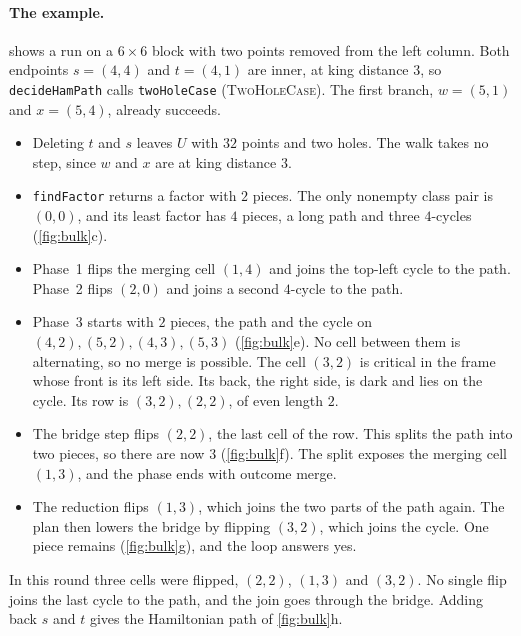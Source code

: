 \documentclass[11pt]{article}
\theoremstyle{plain}
\theoremstyle{definition}
\theoremstyle{remark}
\newcommand{\lean}[1]{\texttt{#1}}
\begin{document}
\paragraph{The example.}
 shows a run on a $6\times6$ block with two points removed from the left column.
Both endpoints $s=(4,4)$ and $t=(4,1)$ are inner, at king distance $3$, so \lean{decideHamPath} calls
\lean{twoHoleCase} (\textsc{TwoHoleCase}).
The first branch, $w=(5,1)$ and $x=(5,4)$, already succeeds.
\begin{itemize}
\item Deleting $t$ and $s$ leaves $U$ with $32$ points and two holes.
  The walk takes no step, since $w$ and $x$ are at king distance $3$.
\item \lean{findFactor} returns a factor with $2$ pieces.
  The only nonempty class pair is $(0,0)$, and its least factor has $4$ pieces, a long path and
  three $4$-cycles (\cref{fig:bulk}c).
\item Phase~1 flips the merging cell $(1,4)$ and joins the top-left cycle to the path.
  Phase~2 flips $(2,0)$ and joins a second $4$-cycle to the path.
\item Phase~3 starts with $2$ pieces, the path and the cycle on $(4,2),(5,2),(4,3),(5,3)$
  (\cref{fig:bulk}e).
  No cell between them is alternating, so no merge is possible.
  The cell $(3,2)$ is critical in the frame whose front is its left side.
  Its back, the right side, is dark and lies on the cycle.
  Its row is $(3,2),(2,2)$, of even length $2$.
\item The bridge step flips $(2,2)$, the last cell of the row.
  This splits the path into two pieces, so there are now $3$ (\cref{fig:bulk}f).
  The split exposes the merging cell $(1,3)$, and the phase ends with outcome merge.
\item The reduction flips $(1,3)$, which joins the two parts of the path again.
  The plan then lowers the bridge by flipping $(3,2)$, which joins the cycle.
  One piece remains (\cref{fig:bulk}g), and the loop answers yes.
\end{itemize}
In this round three cells were flipped, $(2,2)$, $(1,3)$ and $(3,2)$.
No single flip joins the last cycle to the path, and the join goes through the bridge.
Adding back $s$ and $t$ gives the Hamiltonian path of \cref{fig:bulk}h.
\end{document}
